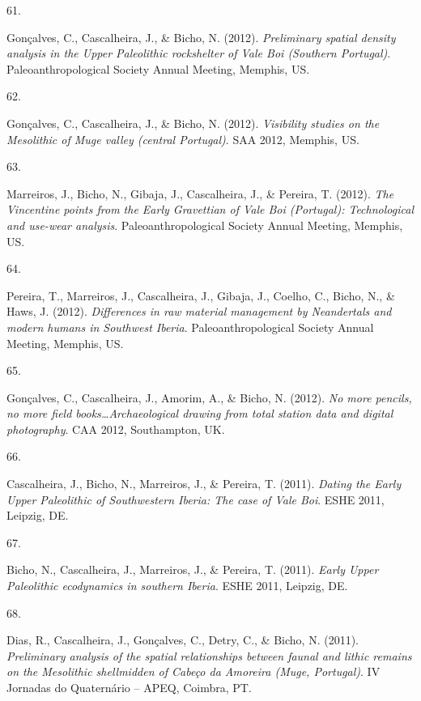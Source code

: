 \documentclass[11pt,a4paper,]{awesome-cv}
\newlength{\cslhangindent}
\newlength{\csllabelwidth}
\newenvironment{CSLReferences}[2] %
 {\begin{list}{}{%
  \setlength{\itemindent}{0pt}
  \setlength{\leftmargin}{0pt}
  \setlength{\parsep}{0pt}
  \ifodd #1
   \setlength{\leftmargin}{\cslhangindent}
   \setlength{\itemindent}{-1\cslhangindent}
  \fi
  \setlength{\itemsep}{#2\baselineskip}}}
 {\end{list}}
\newcommand{\CSLLeftMargin}[1]{\parbox[t]{\csllabelwidth}{\strut#1\strut}}
\newcommand{\CSLRightInline}[1]{\parbox[t]{\linewidth - \csllabelwidth}{\strut#1\strut}}
\begin{document}
\begin{CSLReferences}{0}{0}
\CSLLeftMargin{61. }%
\CSLRightInline{Gonçalves, C., Cascalheira, J., \& Bicho, N. (2012).
\emph{Preliminary spatial density analysis in the Upper Paleolithic
rockshelter of Vale Boi (Southern Portugal)}. Paleoanthropological
Society Annual Meeting, Memphis, US.}

\CSLLeftMargin{62. }%
\CSLRightInline{Gonçalves, C., Cascalheira, J., \& Bicho, N. (2012).
\emph{Visibility studies on the Mesolithic of Muge valley (central
Portugal)}. SAA 2012, Memphis, US.}

\CSLLeftMargin{63. }%
\CSLRightInline{Marreiros, J., Bicho, N., Gibaja, J., Cascalheira, J.,
\& Pereira, T. (2012). \emph{The Vincentine points from the Early
Gravettian of Vale Boi (Portugal): Technological and use-wear analysis}.
Paleoanthropological Society Annual Meeting, Memphis, US.}

\CSLLeftMargin{64. }%
\CSLRightInline{Pereira, T., Marreiros, J., Cascalheira, J., Gibaja, J.,
Coelho, C., Bicho, N., \& Haws, J. (2012). \emph{Differences in raw
material management by Neandertals and modern humans in Southwest
Iberia}. Paleoanthropological Society Annual Meeting, Memphis, US.}

\CSLLeftMargin{65. }%
\CSLRightInline{Gonçalves, C., Cascalheira, J., Amorim, A., \& Bicho, N.
(2012). \emph{No more pencils, no more field books\ldots Archaeological
drawing from total station data and digital photography}. CAA 2012,
Southampton, UK.}

\CSLLeftMargin{66. }%
\CSLRightInline{Cascalheira, J., Bicho, N., Marreiros, J., \& Pereira,
T. (2011). \emph{Dating the Early Upper Paleolithic of Southwestern
Iberia: The case of Vale Boi}. ESHE 2011, Leipzig, DE.}

\CSLLeftMargin{67. }%
\CSLRightInline{Bicho, N., Cascalheira, J., Marreiros, J., \& Pereira,
T. (2011). \emph{Early Upper Paleolithic ecodynamics in southern
Iberia}. ESHE 2011, Leipzig, DE.}

\CSLLeftMargin{68. }%
\CSLRightInline{Dias, R., Cascalheira, J., Gonçalves, C., Detry, C., \&
Bicho, N. (2011). \emph{Preliminary analysis of the spatial
relationships between faunal and lithic remains on the Mesolithic
shellmidden of Cabeço da Amoreira (Muge, Portugal)}. IV Jornadas do
Quaternário -- APEQ, Coimbra, PT.}


\end{CSLReferences}
\end{document}

